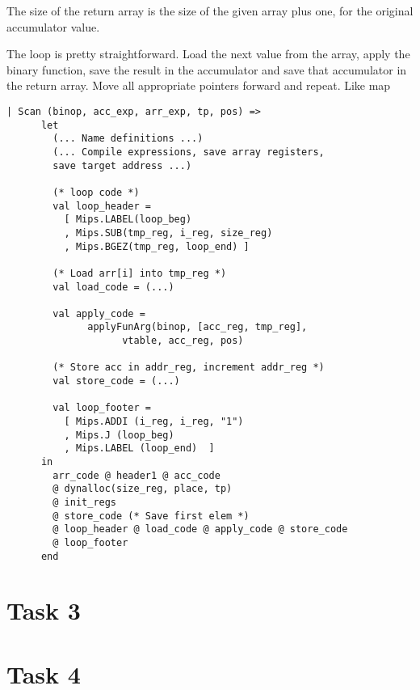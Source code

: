 \documentclass[10pt]{article}
\begin{document}
The size of the return array is the size of the given array plus one, for the original accumulator value.

The loop is pretty straightforward. Load the next value from the array, apply the binary function, save the result in the accumulator and save that accumulator in the return array. Move all appropriate pointers forward and repeat. Like map

\begin{Verbatim}[frame=single]
  | Scan (binop, acc_exp, arr_exp, tp, pos) =>
      let
        (... Name definitions ...)
        (... Compile expressions, save array registers, 
        save target address ...)

        (* loop code *)
        val loop_header =
          [ Mips.LABEL(loop_beg)
          , Mips.SUB(tmp_reg, i_reg, size_reg)
          , Mips.BGEZ(tmp_reg, loop_end) ]
  
        (* Load arr[i] into tmp_reg *)
        val load_code = (...)
  
        val apply_code =
              applyFunArg(binop, [acc_reg, tmp_reg], 
              		vtable, acc_reg, pos)
  
        (* Store acc in addr_reg, increment addr_reg *)
        val store_code = (...)
              
        val loop_footer =
          [ Mips.ADDI (i_reg, i_reg, "1")
          , Mips.J (loop_beg)
          , Mips.LABEL (loop_end)  ]
      in
        arr_code @ header1 @ acc_code
        @ dynalloc(size_reg, place, tp)
        @ init_regs
        @ store_code (* Save first elem *)
        @ loop_header @ load_code @ apply_code @ store_code 
        @ loop_footer
      end
\end{Verbatim}

\section{Task 3}
\section{Task 4}

\begin{Verbatim}[frame=single]

\end{Verbatim}
\end{document}

